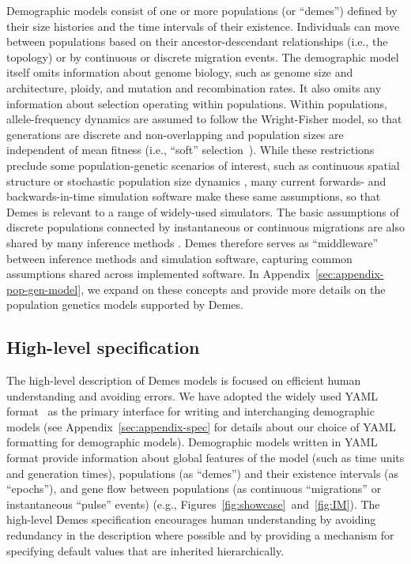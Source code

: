 \documentclass[11pt]{article}
\begin{document}
Demographic models consist of one or more populations (or ``demes'') defined
by their size histories and the time intervals of their existence.
Individuals can move between populations based on their ancestor-descendant
relationships (i.e., the topology) or by continuous or discrete migration events.
The demographic model itself omits information about genome biology, such as
genome size and architecture, ploidy, and mutation and recombination rates.
It also omits any information about selection operating within populations.
Within populations, allele-frequency dynamics are assumed to
follow the Wright-Fisher model, so that generations are discrete and
non-overlapping and population sizes are independent of mean fitness
(i.e., ``soft'' selection~\citep{christiansen1975hard}).
While these restrictions preclude some population-genetic scenarios of
interest, such as continuous spatial structure
\citep{wright1943isolation,barton2002neutral,ringbauer2017inferring,battey2020space}
or stochastic population size dynamics
\citep{nunney1993assessing,orr2014population},
many current forwards- and backwards-in-time simulation software
make these same assumptions, so that Demes is relevant to a range of
widely-used simulators.
The basic assumptions of discrete populations connected by instantaneous or continuous
migrations are also shared by many inference methods
\citep[e.g.,][]{gutenkunst2009inferring,gravel2012population,kamm2017efficient,
jouganous2017inferring,ragsdale2019models,excoffier2021fastsimcoal2}.
Demes therefore serves as ``middleware'' between inference methods and simulation
software, capturing common assumptions shared across implemented software.
In Appendix~\ref{sec:appendix-pop-gen-model}, we expand on these concepts
and provide more details on the population genetics models supported by Demes.

\subsection*{High-level specification}

The high-level description of Demes models is focused on efficient human
understanding and avoiding errors.
We have adopted the widely used YAML format~\citep{ben2009yaml} as the
primary interface for writing and interchanging demographic models
(see Appendix~\ref{sec:appendix-spec} for details about our choice of
YAML formatting for demographic models).
Demographic models written in YAML format provide information about global
features of the model (such as time units and generation times),
populations (as ``demes'') and their existence intervals (as ``epochs''),
and gene flow between populations
(as continuous ``migrations'' or instantaneous ``pulse'' events)
(e.g., Figures~\ref{fig:showcase}~and~\ref{fig:IM}).
The high-level Demes specification encourages human understanding by avoiding
redundancy in the description where possible and by providing a mechanism for
specifying default values that are inherited hierarchically.
\end{document}
